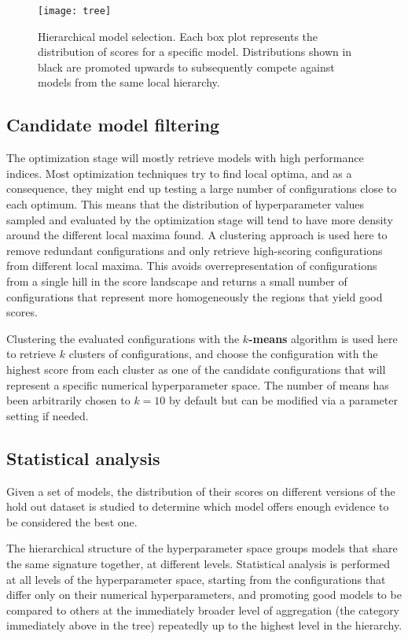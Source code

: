 \begin{figure}[here]
	\texttt{[image: tree]}
	\caption[Hierarchical model selection]{Hierarchical model selection. Each box plot represents
	the distribution of scores for a specific model. Distributions shown in black are promoted
	upwards to subsequently compete against models from the same local hierarchy.}
	\label{img:tree}
\end{figure}

\subsection{Candidate model filtering}
The optimization stage will mostly retrieve models with high performance indices. Most optimization
techniques try to find local optima, and as a consequence, they might end up testing a large number
of configurations close to each optimum. This means that the distribution of hyperparameter values
sampled and evaluated by the optimization stage will tend to have more density around the different
local maxima found. A clustering approach is used here to remove redundant configurations and only retrieve
high-scoring configurations from different local maxima. This avoids overrepresentation of
configurations from a single hill in the score landscape and returns a small number of
configurations that represent more homogeneously the regions that yield good scores.

Clustering the evaluated configurations with the {\bf $k$-means} algorithm is used here to retrieve
$k$ clusters of configurations, and choose the configuration with the highest score from each cluster as
one of the candidate configurations that will represent a specific numerical hyperparameter space.
The number of means has been arbitrarily chosen to $k = 10$ by default but can be modified via a
parameter setting if needed.

\subsection{Statistical analysis}

Given a set of models, the distribution of their scores on different versions of the hold out
dataset is studied to determine which model offers enough evidence to be considered the best one.

The hierarchical structure of the hyperparameter space groups models that share the same signature
together, at different levels. Statistical analysis is performed at all levels of the
hyperparameter space, starting from the configurations that differ only on their numerical
hyperparameters, and promoting good models to be compared to others at the immediately broader
level of aggregation (the category immediately above in the tree) repeatedly up to the highest level
in the hierarchy.

